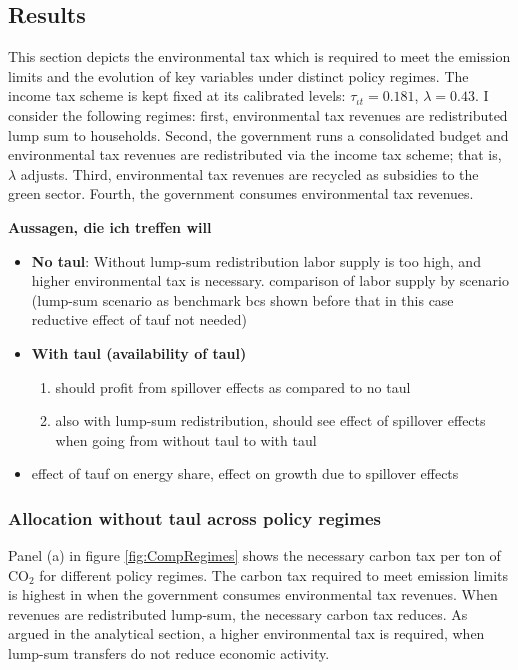 \subsection{Results }
This section depicts the environmental tax which is required to meet the emission limits and the evolution of key variables under distinct policy regimes. The income tax scheme is kept fixed at its calibrated levels: $\tau_{\iota t}=0.181$, $\lambda=0.43$.
I consider the following regimes: first, environmental tax revenues are redistributed lump sum to households. Second, the government runs a consolidated budget and environmental tax revenues are redistributed via the income tax scheme; that is, $\lambda$ adjusts. Third, environmental tax revenues are recycled as subsidies to the green sector. Fourth, the government consumes environmental tax revenues. 

\textbf{Aussagen, die ich treffen will}
\begin{itemize}
	\item \textbf{No taul}:  Without lump-sum redistribution labor supply is too high, and higher environmental tax is necessary.  comparison of labor supply by scenario (lump-sum scenario as benchmark bcs shown before that in this case reductive effect of tauf not needed)
	\item \textbf{With taul (availability of taul)}
	\begin{enumerate}
	\item should profit from spillover effects as compared to no taul
 	\item 
	also with lump-sum redistribution, should see effect of spillover effects when going from without taul to with taul	
	\end{enumerate}
	\item effect of tauf on energy share, effect on growth due to spillover effects
\end{itemize}
\subsubsection{Allocation without taul across policy regimes}

Panel (a) in figure \ref{fig:CompRegimes} shows the necessary carbon tax per ton of CO$_2$ for different policy regimes. The carbon tax required to meet emission limits is highest in when the government consumes environmental tax revenues. When revenues are redistributed lump-sum, the necessary carbon tax reduces. As argued in the analytical section, a higher environmental tax is required, when lump-sum transfers do not reduce economic activity. 

